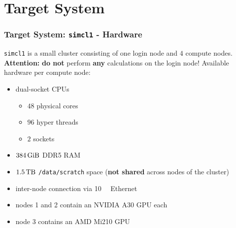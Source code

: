 \section{Target System}
\begin{frame}
  \frametitle{Target System: \texttt{simcl1} - Hardware}
  \texttt{simcl1} is a small cluster consisting of one login node and $\num{4}$ compute nodes. \\
  \textbf{Attention:} \textbf{do not} perform \textbf{any} calculations on the login node!
  \vfill
  Available hardware per compute node:
  \begin{itemize}
      \item dual-socket  CPUs
      \begin{itemize}
          \item $\num{48}$ physical cores
          \item $\num{96}$ hyper threads
          \item $\num{2}$ sockets
      \end{itemize}
      \item $\SI{384}{\gibi\byte}$ DDR5 RAM
      \item $\SI{1.5}{\tera\byte}$ \texttt{/data/scratch} space (\textbf{not shared} across nodes of the cluster)\\
      \item inter-node connection via \SI{10}{\giga\byte} Ethernet
      \item nodes 1 and 2 contain an NVIDIA A30 GPU each
      \item node 3 contains an AMD Mi210 GPU
  \end{itemize}
\end{frame}

